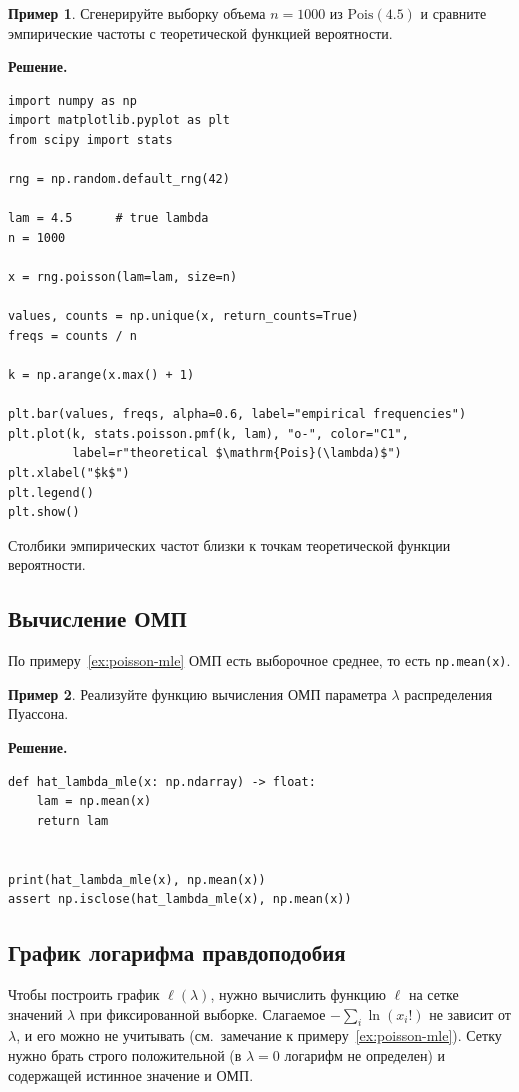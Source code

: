 \documentclass[a4paper,12pt]{article}
\theoremstyle{definition}
\newtheorem{example}{Пример}
\theoremstyle{plain}
\theoremstyle{remark}
\begin{document}
\begin{example}
Сгенерируйте выборку объема $n=1000$ из $\mathrm{Pois}(4.5)$ и сравните эмпирические частоты с теоретической функцией вероятности.
\end{example}

\noindent\textbf{Решение.}
\begin{lstlisting}
import numpy as np
import matplotlib.pyplot as plt
from scipy import stats

rng = np.random.default_rng(42)

lam = 4.5      # true lambda
n = 1000

x = rng.poisson(lam=lam, size=n)

values, counts = np.unique(x, return_counts=True)
freqs = counts / n

k = np.arange(x.max() + 1)

plt.bar(values, freqs, alpha=0.6, label="empirical frequencies")
plt.plot(k, stats.poisson.pmf(k, lam), "o-", color="C1",
         label=r"theoretical $\mathrm{Pois}(\lambda)$")
plt.xlabel("$k$")
plt.legend()
plt.show()
\end{lstlisting}
Столбики эмпирических частот близки к точкам теоретической функции вероятности.

\subsection{Вычисление ОМП}

По примеру~\ref{ex:poisson-mle} ОМП есть выборочное среднее, то есть \lstinline|np.mean(x)|.

\begin{example}
Реализуйте функцию вычисления ОМП параметра $\lambda$ распределения Пуассона.
\end{example}

\noindent\textbf{Решение.}
\begin{lstlisting}
def hat_lambda_mle(x: np.ndarray) -> float:
    lam = np.mean(x)
    return lam


print(hat_lambda_mle(x), np.mean(x))
assert np.isclose(hat_lambda_mle(x), np.mean(x))
\end{lstlisting}

\subsection{График логарифма правдоподобия}

Чтобы построить график $\ell(\lambda)$, нужно вычислить функцию $\ell$ на сетке значений $\lambda$ при фиксированной выборке. Слагаемое $-\sum_i\ln(x_i!)$ не зависит от $\lambda$, и его можно не учитывать (см.\ замечание к примеру~\ref{ex:poisson-mle}). Сетку нужно брать строго положительной (в $\lambda=0$ логарифм не определен) и содержащей истинное значение и ОМП.
\end{document}
